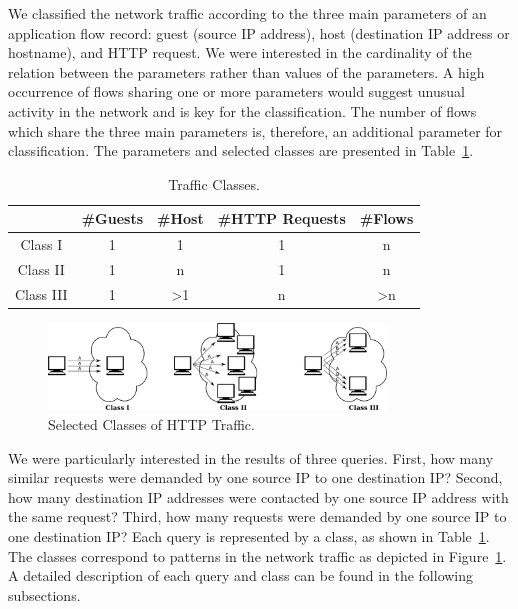 We classified the network traffic according to the three main parameters of an application flow record: guest (source IP address), host (destination IP address or hostname), and HTTP request. We were interested in the cardinality of the relation between the parameters rather than values of the parameters. A high occurrence of flows sharing one or more parameters would suggest unusual activity in the network and is key for the classification. The number of flows which share the three main parameters is, therefore, an additional parameter for classification. The parameters and selected classes are presented in Table~\ref{tab:httpsecurity-classes}.

\begin{table}[ht]
\centering
\begin{tabular}{| c | c | c | c | c |} \hline
 &\#Guests & \#Host & \#HTTP Requests & \#Flows \\ \hline
Class I   & 1 &              1 & 1 & n \\ \hline
Class II  & 1 &              n & 1 & n \\ \hline
Class III & 1 & \textgreater 1 & n & \textgreater n \\ \hline
\end{tabular}
\caption{Traffic Classes.}
\label{tab:httpsecurity-classes}
\end{table}

\begin{figure}
  \centering
  \includegraphics[width=0.8\textwidth]{figures/paper-httpsecurity/classes}
  \caption{Selected Classes of HTTP Traffic.}
  \label{fig:httpsecurity-classes}
\end{figure}


We were particularly interested in the results of three queries. First, how many similar requests were demanded by one source IP to one destination IP? Second, how many destination IP addresses were contacted by one source IP address with the same request? Third, how many requests were demanded by one source IP to one destination IP? Each query is represented by a class, as shown in Table~\ref{tab:httpsecurity-classes}. The classes correspond to patterns in the network traffic as depicted in Figure~\ref{fig:httpsecurity-classes}. A detailed description of each query and class can be found in the following subsections.

